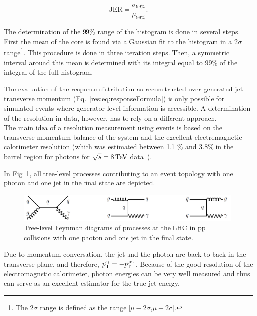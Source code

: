 \begin{equation*}\label{res:eq:resolutionFormula}
\text{JER} = \frac{\sigma_{99\%}}{\mu_{99\%}}.
\end{equation*}

The determination of the 99\% range of the histogram is done in several steps. 
First the mean of the core is found via a Gaussian fit to the histogram in a 2$\sigma$ range\footnote{The 2$\sigma$ range is defined as the range [$\mu - 2\sigma$,$\mu + 2\sigma$].}. 
This procedure is done in three iteration steps.
Then, a symmetric interval around this mean is determined with its integral equal to 99\% of the integral of the full histogram. 


The evaluation of the response distribution as reconstructed over generated jet transverse momentum (\mbox{Eq.~\eqref{res:eq:responseFormula}})
is only possible for simulated events where generator-level information is accessible. 
A determination of the resolution in data, however, has to rely on a different approach.\\

The main idea of a resolution measurement using \GAMJET events is based on the transverse momentum balance of the \GAMJET system and the excellent electromagnetic calorimeter resolution
(which was estimated between 1.1 \% and 3.8\% in the barrel region for photons for $\sqrt{s}=8\,\text{Te}\kern-0.06667em\text{V}$ data~\cite{bib:CMS:PhotonResolution_8TeV}).

In Fig~\ref{res:fig:FeynmanDiagrams}, all tree-level processes contributing to an event topology with one photon and one jet in the final state are depicted. 
\begin{figure}[b]
  \centering
      \includegraphics[width=0.99\textwidth]{figures/resolution/generalApproach/FeynmanDiagram.pdf}
  \caption{Tree-level Feynman diagrams of processes at the LHC in pp collisions with one photon and one jet in the final state.}  
  \label{res:fig:FeynmanDiagrams}
\end{figure}
Due to momentum conversation, the jet and the photon are back to back in the transverse plane, and therefore, $\vec{p}_{\text{T}}^{\,\gamma} = -\vec{p}_{\text{T}}^{\,\text{jet}}$. 
Because of the good resolution of the electromagnetic calorimeter, photon energies can be very well measured 
and thus can serve as an excellent estimator for the true jet energy.


